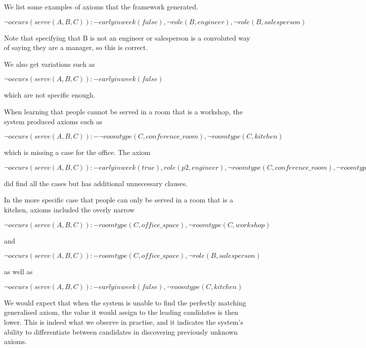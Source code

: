 We list some examples of axioms that the framework generated.

$\neg occurs(serve(A,B,C)) :- earlyinweek(false), \neg role(B,engineer), \neg role(B,salesperson)$

Note that specifying that B is not an engineer or salesperson is a 
convoluted way of saying they are a manager, so this is correct.

We also get variations such as 

$\neg occurs(serve(A,B,C)) :- earlyinweek(false)$

which are not specific enough.

When learning that people cannot be served in a room that is a workshop, the system produced
axioms such as 

$\neg occurs(serve(A,B,C)) :- \neg roomtype(C,conference\_room), \neg roomtype(C,kitchen)$

which is missing a case for the office. The axiom

$\neg occurs(serve(A,B,C)) :- earlyinweek(true), role(p2, engineer), \neg roomtype(C, conference\_room),
\neg roomtype(C, kitchen), \neg roomtype(C, office\_space)$

did find all the cases but has additional unnecessary clauses.

In the more specific case that people can only be served in a room that is a kitchen, 
axioms included the overly narrow

$\neg occurs(serve(A,B,C)) :- roomtype(C,office\_space), \neg roomtype(C,workshop)$

and

$\neg occurs(serve(A,B,C)) :- roomtype(C, office\_space), \neg role(B, salesperson)$

as well as 

$\neg occurs(serve(A,B,C)) :- earlyinweek(false), \neg roomtype(C, kitchen)$

%

We would expect that when the system is unable to find the perfectly matching 
generalised axiom, the value it would assign to the leading candidates is then lower. 
This is indeed what we observe in practise, and it indicates the system's 
ability to differentiate between candidates in discovering previously unknown axioms. 




